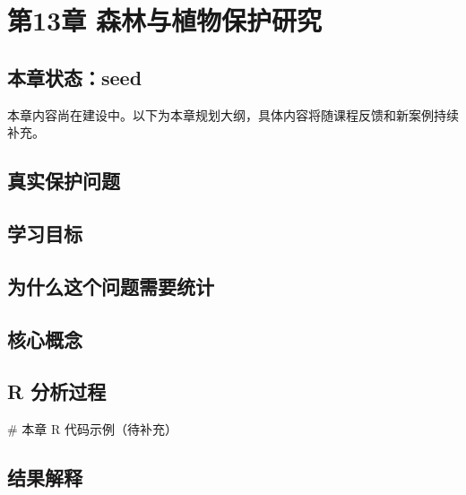 \documentclass[
  letterpaper,
]{scrbook}
\newenvironment{Shaded}{\begin{snugshade}}{\end{snugshade}}
\newcommand{\CommentTok}[1]{\textcolor[rgb]{0.37,0.37,0.37}{#1}}
\begin{document}
\chapter{第13章
森林与植物保护研究}\label{ux7b2c13ux7ae0-ux68eeux6797ux4e0eux690dux7269ux4fddux62a4ux7814ux7a76-1}

\section{本章状态：seed}\label{ux672cux7ae0ux72b6ux6001seed-3}

本章内容尚在建设中。以下为本章规划大纲，具体内容将随课程反馈和新案例持续补充。

\section{真实保护问题}\label{ux771fux5b9eux4fddux62a4ux95eeux9898-9}

\section{学习目标}\label{ux5b66ux4e60ux76eeux6807-6}

\section{为什么这个问题需要统计}\label{ux4e3aux4ec0ux4e48ux8fd9ux4e2aux95eeux9898ux9700ux8981ux7edfux8ba1-3}

\section{核心概念}\label{ux6838ux5fc3ux6982ux5ff5-3}

\section{R 分析过程}\label{r-ux5206ux6790ux8fc7ux7a0b-5}

\begin{Shaded}
\begin{Highlighting}[]
\CommentTok{\# 本章 R 代码示例（待补充）}
\end{Highlighting}
\end{Shaded}

\section{结果解释}\label{ux7ed3ux679cux89e3ux91ca-3}
\end{document}
